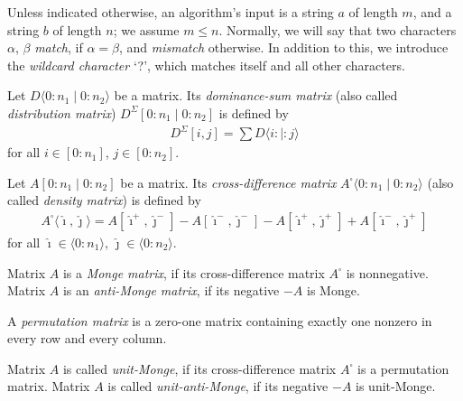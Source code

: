 \documentclass[a4paper,UKenglish,cleveref]{lipics-v2021}
\newcommand{\A}{\hat}
\newcommand{\charwild}{\textsf ?}
\newcommand{\bra}[1]{[#1]}
\newcommand{\ang}[1]{\langle#1\rangle}
\begin{document}
Unless indicated otherwise, an algorithm's input is
a string $a$ of length $m$, and a string $b$ of length $n$;
we assume $m \leq n$.
Normally, we will say that two characters $\alpha$, $\beta$ \emph{match}, 
if $\alpha=\beta$, and \emph{mismatch} otherwise.
In addition to this, we introduce the \emph{wildcard character} `\charwild',
which matches itself and all other characters.

\begin{definition}
\label{def-dsum}
%
Let $D\ang{0:n_1 \mid 0:n_2}$ be a matrix.
Its \emph{dominance-sum matrix} (also called \emph{distribution matrix})
$D^\Sigma\bra{0:n_1 \mid 0:n_2}$ is defined by
%
\begin{gather*}
%
\textstyle
D^\Sigma\bra{i,j} = \sum D\ang{i: \mid :j}
%
\end{gather*}
%
for all $i \in \bra{0:n_1}$, $j \in \bra{0:n_2}$.
%
\end{definition}

\begin{definition}
\label{def-xdiff}
%
Let $A\bra{0:n_1 \mid 0:n_2}$ be a matrix.
Its \emph{cross-difference matrix} $A^\square\ang{0:n_1 \mid 0:n_2}$
(also called \emph{density matrix}) is defined by
%
\begin{gather*}
%
A^\square\ang{\A\imath,\A\jmath} =
A\bra{\A\imath^+,\A\jmath^-} - A\bra{\A\imath^-,\A\jmath^-} -
A\bra{\A\imath^+,\A\jmath^+} + A\bra{\A\imath^-,\A\jmath^+}
%
\end{gather*}
%
for all $\A\imath \in \ang{0:n_1}$, $\A\jmath \in \ang{0:n_2}$.
%
\end{definition}

\begin{definition}
\label{def-monge}
%
%
Matrix $A$ is a \emph{Monge matrix},
if its cross-difference matrix $A^\square$ is nonnegative.
Matrix $A$ is an \emph{anti-Monge matrix}, if its negative $-A$ is Monge.
%
\end{definition}

\begin{definition}
\label{def-permutation}
%
A \emph{permutation matrix}
is a zero-one matrix containing exactly one nonzero 
in every row and every column.
%
\end{definition}

\begin{definition}
\label{def-umonge}
%
Matrix $A$ is called \emph{unit-Monge},
if its cross-difference matrix $A^\square$ is a permutation matrix.
Matrix $A$ is called \emph{unit-anti-Monge}, 
if its negative $-A$ is unit-Monge.
%
\end{definition}
\end{document}
